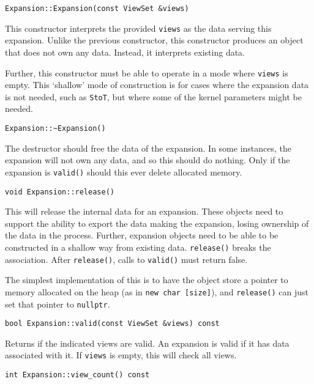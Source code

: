 \begin{lstlisting}
Expansion::Expansion(const ViewSet &views)
\end{lstlisting}

\noindent This constructor interprets the provided \texttt{views} as the data
serving this expansion. Unlike the previous constructor, this constructor
produces an object that does not own any data. Instead, it interprets existing
data.

Further, this constructor must be able to operate in a mode where \texttt{views}
is empty. This `shallow' mode of construction is for cases where the
expansion data is not needed, such as \texttt{StoT}, but where
some of the kernel parameters might be needed.

\begin{lstlisting}
Expansion::~Expansion()
\end{lstlisting}

\noindent The destructor should free the data of the expansion. In some
instances, the expansion will not own any data, and so this should do nothing.
Only if the expansion is \texttt{valid()} should this ever delete allocated
memory.

\begin{lstlisting}
void Expansion::release()
\end{lstlisting}

\noindent This will release the internal data for an expansion. These objects
need to support the ability to export the data making the expansion, losing
ownership of the data in the process. Further, expansion objects need to be
able to be constructed in a shallow way from existing data. \texttt{release()}
breaks the association. After \texttt{release()}, calls to \texttt{valid()}
must return false.

The simplest implementation of this is to have the object store a pointer to
memory allocated on the heap (as in \texttt{new char [size]}), and
\texttt{release()} can just set that pointer to \texttt{nullptr}.

\begin{lstlisting}
bool Expansion::valid(const ViewSet &views) const
\end{lstlisting}

\noindent Returns if the indicated views are valid. An expansion is valid if it
has data associated with it. If \texttt{views} is empty, this will check all
views.

\begin{lstlisting}
int Expansion::view_count() const
\end{lstlisting}

